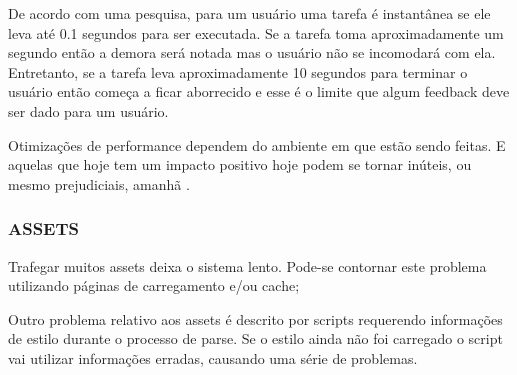 \begin{draft}
De acordo com uma pesquisa, para um usuário uma tarefa é instantânea
se ele leva até 0.1 segundos para ser executada. Se a tarefa toma
aproximadamente um segundo então a demora será notada mas o
usuário não se incomodará com ela. Entretanto, se a tarefa leva
aproximadamente 10 segundos para terminar o usuário então começa a
ficar aborrecido e esse é o limite que algum feedback deve ser dado
para um usuário.

Otimizações de performance dependem do ambiente em que estão
sendo feitas. E aquelas que hoje tem um impacto positivo hoje
podem se tornar inúteis, ou mesmo prejudiciais, amanhã
\autocite[pp.131]{html5mostwanted}.

\subsubsection{ASSETS}

Trafegar muitos assets deixa o sistema lento. Pode-se contornar este
problema utilizando páginas de carregamento e/ou cache;

Outro problema relativo aos assets é descrito por \cite{howBrowsersWork}
scripts requerendo informações de estilo durante o processo de
parse. Se o estilo ainda não foi carregado o script vai utilizar
informações erradas, causando uma série de problemas.

\end{draft}
